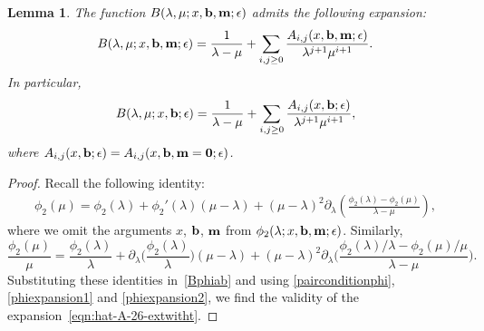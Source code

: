 \documentclass[11pt]{article}
\numberwithin{equation}{section}
\newcommand{\e}{\epsilon}
\newcommand{\p}{\partial}
\newcommand{\beq}{\begin{equation}}
\newcommand{\eeq}{\end{equation}}
\numberwithin{equation}{section}
\newtheorem{Lemma}[Theorem]{Lemma}
\begin{document}
\begin{Lemma}
The function $B(\lambda,\mu; x, {\bf b},{\bf m};\e)$ admits the following expansion:
\beq\label{eqn:hat-A-26-extwitht}
B(\lambda,\mu; x, {\bf b},{\bf m};\e) =
\frac1{\lambda-\mu} + \sum_{i,j\ge0} \frac{A_{i,j}(x, {\bf b},{\bf m};\e)}{\lambda^{j+1} \mu^{i+1}} .
\eeq
In particular,
\beq\label{eqn:hat-A-26-ext}
B(\lambda,\mu;x, {\bf b};\e) =
\frac1{\lambda-\mu} + \sum_{i,j\ge0} \frac{A_{i,j}(x, {\bf b};\e)}{\lambda^{j+1} \mu^{i+1}} ,
\eeq
where
$A_{i,j}(x, {\bf b};\e)=A_{i,j}(x, {\bf b},{\bf m}={\bf 0};\e)$.
\end{Lemma}
\begin{proof}
Recall the following identity:
\begin{align*}
\phi_2(\mu) = \phi_2(\lambda)+\phi_2'(\lambda)(\mu-\lambda)
+ (\mu-\lambda)^2 \p_\lambda \left(\frac{\phi_2(\lambda)-\phi_2(\mu)}{\lambda-\mu}\right),
\end{align*}
where we omit the arguments $x$, ${\bf b}$, ${\bf m}$ from $\phi_2(\lambda; x, {\bf b}, {\bf m};\e)$.
Similarly,
\[
\frac{\phi_2(\mu)}{\mu} = \frac{\phi_2(\lambda)}{\lambda}+\p_\lambda\biggl(\frac{\phi_2(\lambda)}{\lambda}\biggr) (\mu-\lambda)
+ (\mu-\lambda)^2 \p_\lambda \biggl(\frac{\phi_2(\lambda)/\lambda-\phi_2(\mu)/\mu}{\lambda-\mu}\biggr).
\]
Substituting these identities in~\eqref{Bphiab} and using \eqref{pairconditionphi}, \eqref{phiexpansion1} and \eqref{phiexpansion2}, we find the validity of the expansion~\eqref{eqn:hat-A-26-extwitht}.
\end{proof}
\end{document}
